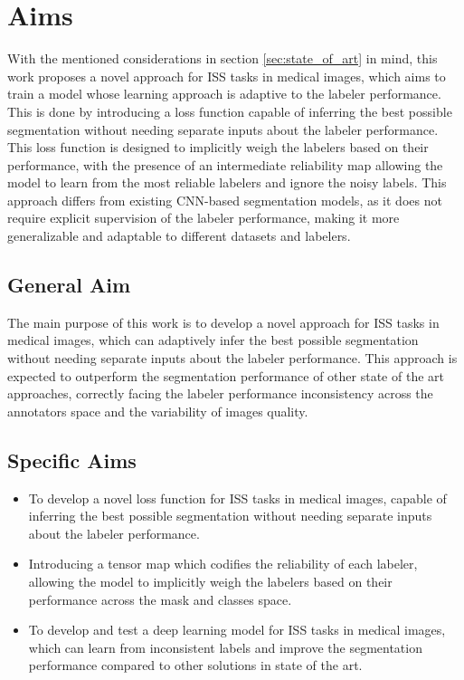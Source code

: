
\section{Aims}\label{sec:objectives}

With the mentioned considerations in section \ref{sec:state_of_art}
in mind, this work proposes a novel approach for \gls{ISS} tasks in
medical images, which aims to train a model whose learning approach
is adaptive to the labeler performance. This is done by introducing a
loss function capable of inferring the best possible segmentation
without needing separate inputs about the labeler performance. This
loss function is designed to implicitly weigh the labelers based on
their performance, with the presence of an intermediate reliability
map allowing the model to learn from the most reliable labelers and
ignore the noisy labels. This approach differs from existing
\gls{CNN}-based segmentation models, as it does not require explicit
supervision of the labeler performance, making it more generalizable
and adaptable to different datasets and labelers.
\subsection{General Aim}

The main purpose of this work is to develop a novel approach for
\gls{ISS} tasks in medical images, which can adaptively infer the best
possible segmentation without needing separate inputs about the
labeler performance. This approach is expected to outperform the
segmentation performance of other state of the art approaches,
correctly facing the labeler performance inconsistency across the
annotators space and the variability of images quality.

\subsection{Specific Aims}

\begin{itemize}

  \item To develop a novel loss function for \gls{ISS} tasks in
    medical images, capable of inferring the best possible
    segmentation without needing separate inputs about the labeler
    performance.

  \item Introducing a tensor map which codifies the reliability of
    each labeler, allowing the model to implicitly weigh the labelers
    based on their performance across the mask and classes space.

  \item To develop and test a deep learning model for \gls{ISS} tasks
    in medical images, which can learn from inconsistent labels and
    improve the segmentation performance compared to other solutions
    in state of the art.

\end{itemize}
